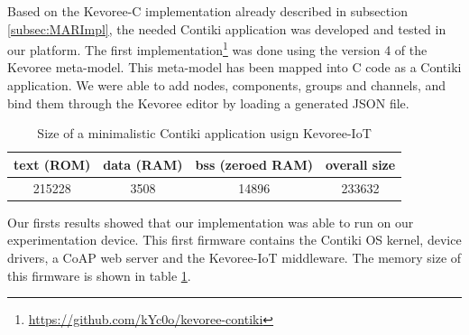 


Based on the Kevoree-C implementation already described in subsection \ref{subsec:MARImpl}, the needed Contiki application was developed and tested in our platform.
The first implementation\footnote{\url{https://github.com/kYc0o/kevoree-contiki}} was done using the version 4 of the Kevoree meta-model.
This meta-model has been mapped into C code as a Contiki application.
We were able to add nodes, components, groups and channels, and bind them through the Kevoree editor by loading a generated JSON file.

\begin{table}[htb]
	\centering
	\caption{Size of a minimalistic Contiki application usign Kevoree-IoT}
	\label{tab:kevoreeContiki}
	\begin{tabular}{|c|c|c|c|}
		\hline
		\textbf{text (ROM)}   & \textbf{data (RAM)} & \textbf{bss (zeroed RAM)} & \textbf{overall size} \\ \hline
		215228 & 3508 & 14896 & 233632 \\ \hline     
	\end{tabular}
\end{table}

Our firsts results showed that our implementation was able to run on our experimentation device.
This first firmware contains the Contiki OS kernel, device drivers, a CoAP web server and the Kevoree-IoT middleware.
The memory size of this firmware is shown in table \ref{tab:kevoreeContiki}.

